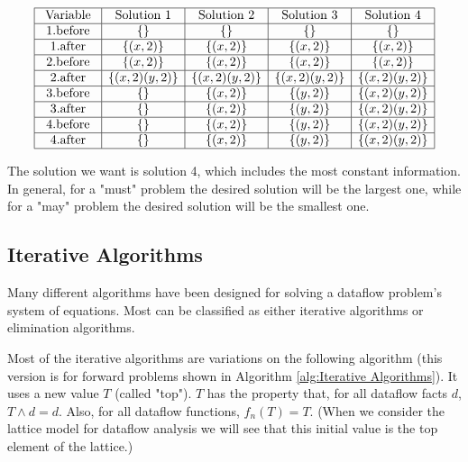 $$
	\begin{array}{|c|c|c|c|c|}
		\hline \text { Variable }        & \text { Solution 1 } & \text { Solution 2 } & \text { Solution 3 } & \text { Solution 4 } \\
		\hline  \text { 1.before } & \{\}                 & \{\}                 & \{\}                 & \{\}                 \\
		\hline  \text { 1.after }  & \{(x, 2)\}           & \{(x, 2)\}           & \{(x, 2)\}           & \{(x, 2)\}           \\
		\hline  \text { 2.before } & \{(x, 2)\}           & \{(x, 2)\}           & \{(x, 2)\}           & \{(x, 2)\}           \\
		\hline  \text { 2.after }  & \{(x, 2)(y, 2)\}     & \{(x, 2)(y, 2)\}     & \{(x, 2)(y, 2)\}     & \{(x, 2)(y, 2)\}     \\
		\hline  \text { 3.before } & \{\}                 & \{(x, 2)\}           & \{(y, 2)\}           & \{(x, 2)(y, 2)\}     \\
		\hline  \text { 3.after }  & \{\}                 & \{(x, 2)\}           & \{(y, 2)\}           & \{(x, 2)(y, 2)\}     \\
		\hline  \text { 4.before } & \{\}                 & \{(x, 2)\}           & \{(y, 2)\}           & \{(x, 2)(y, 2)\}     \\
		\hline  \text { 4.after }  & \{\}                 & \{(x, 2)\}           & \{(y, 2)\}           & \{(x, 2)(y, 2)\}     \\
		\hline
	\end{array}
$$

The solution we want is solution 4, which includes the most constant
information. In general, for a "must" problem the desired solution will be
the largest one,
while for a "may" problem the desired solution will be the smallest one.


\subsection{Iterative Algorithms}

Many different algorithms have been designed for solving a dataflow
problem's system of equations. Most can be classified as either
iterative algorithms or elimination algorithms.


Most of the iterative algorithms are variations on the following
algorithm (this version is for forward problems shown in Algorithm \ref{alg:Iterative Algorithms}). It uses a new
value $T$ (called "top"). $T$ has the property that, for all dataflow
facts $d$, $T \wedge d = d$. Also, for all dataflow functions, $f_n(T) = T$.
(When we consider the lattice model for dataflow analysis we
will see that this initial value is the top element of the lattice.)






